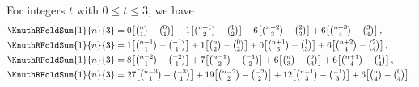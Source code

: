 \begin{example}
  For integers $t$ with $0 \le t \le 3$, we have
  \begin{align*}
    \KnuthRFoldSum{1}{n}{3}
    &= 0\!\left[\tbinom{n}{1}-\tbinom{0}{1}\right]
    + 1\!\left[\tbinom{n+1}{2}-\tbinom{1}{2}\right]
    - 6\!\left[\tbinom{n+2}{3}-\tbinom{2}{3}\right]
    + 6\!\left[\tbinom{n+3}{4}-\tbinom{3}{4}\right], \\
    \KnuthRFoldSum{1}{n}{3}
    &= 1\!\left[\tbinom{n-1}{1}-\tbinom{-1}{1}\right]
    + 1\!\left[\tbinom{n}{2}-\tbinom{0}{2}\right]
    + 0\!\left[\tbinom{n+1}{3}-\tbinom{1}{3}\right]
    + 6\!\left[\tbinom{n+2}{4}-\tbinom{2}{4}\right], \\
    \KnuthRFoldSum{1}{n}{3}
    &= 8\!\left[\tbinom{n-2}{1}-\tbinom{-2}{1}\right]
    + 7\!\left[\tbinom{n-1}{2}-\tbinom{-1}{2}\right]
    + 6\!\left[\tbinom{n}{3}-\tbinom{0}{3}\right]
    + 6\!\left[\tbinom{n+1}{4}-\tbinom{1}{4}\right], \\
    \KnuthRFoldSum{1}{n}{3}
    &= 27\!\left[\tbinom{n-3}{1}-\tbinom{-3}{1}\right]
    + 19\!\left[\tbinom{n-2}{2}-\tbinom{-2}{2}\right]
    + 12\!\left[\tbinom{n-1}{3}-\tbinom{-1}{3}\right]
    + 6\!\left[\tbinom{n}{4}-\tbinom{0}{4}\right].
  \end{align*}
\end{example}
